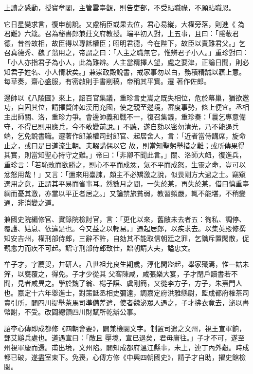 \begin{pinyinscope}
 上讀之感動，授寶章閣，主管雲臺觀，則告吏部，不受貼職祿，不願貼職恩。



 它日星變求言，復申前說。又慮柄臣或果去位，君心易縱，大權旁落，則進《
 為君難》六箴。召為秘書郎兼莊文府教授。端平初入對，上五事，且曰：「隱蔽君德，昔咎故相，故臣得以專詆權臣；昭明君德，今在陛下，故臣以責難君父。」乞召真德秀、魏了翁用之，帝謂之曰：「人主之職無它，惟辨君子小人。」重珍對曰：「小人亦指君子為小人，此為難辨。人主當精擇人望，處之要津，正論日聞，則必知君子姓名、小人情狀矣。」兼崇政殿說書，戒家事勿以白，務積精誠以寤上意。每草奏，齋心盛服，有密啟則手書削稿，帝稱其平實。遷
 著作佐郎。



 邊帥以《八陵圖》來上，詔百官集議，重珍言史嵩之既失相位，危於幕巢，猶欲邀功，自固其位，請擇賢帥如漢用充國，使之親至邊境，審度事勢，條上便宜。丞相主出師關、洛，重珍力爭。會邊帥義和戰不一，復召集議，重珍奏：「曩乞專意備守，不得已則用應兵，今不敢變前說。」不聽，遂自劾以密勿清光，乃不能遏兵端，乞免說書職。遷著作郎兼權司封郎官、起居舍人，言：「近者當侍講席，旋命止之，或曰是日道流生朝。夫輟講偶以它
 故，則當知聖躬舉措之難；或所傳果得其實，則當知聖心持守之難。」帝曰：「非卿不聞此言。」關、洛師大衄，復進兵，重珍言：「若恥敗而欲勝之，則心不平而成忿，氣不平而成怒，生靈之命，豈可以忿怒用哉！」又言：「邇來用臺諫，頗主不必矯激之說，似畏剛方大過之士。竊窺選用之意，正謂其平易而省事耳。然數月之間，一失於某，再失於某，借曰慎重臺綱而憂其激，亦當以平正者居之。」又論禁旅貧弱，教習頻嚴，輒不能堪，不稍變通，非消變之道。



 兼國史院編修官、實錄院檢討官，言：「更化以來，舊敝未去者五：徇私、調停、覆護、姑息、依違是也。今又益之以輕易。」遷起居郎，以疾求去。以集英殿修撰知安吉州，權刑部侍郎，三辭不許，自劾其不能取信朝廷之罪，乞鐫斥置閑散，促覲愈力而疾不可起。詔守刑部侍郎致仕，贈朝請大夫，謚忠文。



 牟子才，字薦叟，井研人。八世祖允良生期歲，淳化間盜起，舉家殲焉，惟一姑未笄，以甕覆之，得免。子才少從其
 父客陳咸，咸張樂大宴，子才閉戶讀書若不聞，見者咸異之。學於魏了翁、楊子謨、虞剛簡，又從李方子，方子，朱熹門人也。嘉定十六年舉進士，對策詆丞相史彌遠，調嘉定府洪雅縣尉，監成都府榷茶司賣引所，闢四川提舉茶馬司準備差遣，使者魏泌眾人遇之，子才拂衣竟去，泌以書幣謝，不受。改闢總領四川財賦所乾辦公事。



 詔李心傳即成都修《四朝會要》，闢兼檢閱文字。制置司遣之文州，視王宣軍餉，鄧艾縋兵處也。道遇宣曰：「敵且
 壓境，宣已退矣，君毋庸往。」子才不可，遂至州視軍慶而還。甫出境，文州陷。闢知成都府溫江縣事，未上，連丁內外艱。時成都已破，遂盡室東下。免喪，心傳方修《中興四朝國史》，請子才自助，擢史館檢閱。




\end{pinyinscope}
